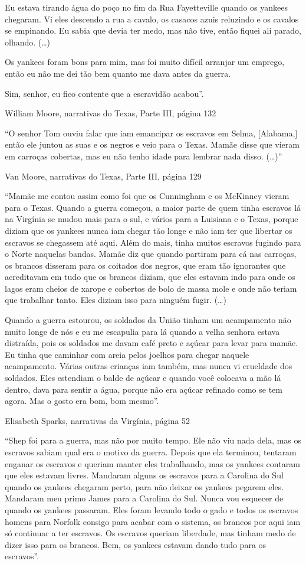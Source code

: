 Eu estava tirando água do poço no fim da Rua Fayetteville quando os
yankees chegaram. Vi eles descendo a rua a cavalo, os casacos azuis
reluzindo e os cavalos se empinando. Eu sabia que devia ter medo, mas
não tive, então fiquei ali parado, olhando. (\ldots{})

Os yankees foram bons para mim, mas foi muito difícil arranjar um
emprego, então eu não me dei tão bem quanto me dava antes da guerra.

Sim, senhor, eu fico contente que a escravidão acabou''.

William Moore, narrativas do Texas, Parte III, página 132

``O senhor Tom ouviu falar que iam emancipar os escravos em Selma,
{[}Alabama,{]} então ele juntou as suas e os negros e veio para o Texas.
Mamãe disse que vieram em carroças cobertas, mas eu não tenho idade para
lembrar nada disso. (\ldots{})''

Van Moore, narrativas do Texas, Parte III, página 129

``Mamãe me contou assim como foi que os Cunningham e os McKinney vieram
para o Texas. Quando a guerra começou, a maior parte de quem tinha
escravos lá na Virgínia se mudou mais para o sul, e vários para a
Luisiana e o Texas, porque diziam que os yankees nunca iam chegar tão
longe e não iam ter que libertar os escravos se chegassem até aqui. Além
do mais, tinha muitos escravos fugindo para o Norte naquelas bandas.
Mamãe diz que quando partiram para cá nas carroças, os brancos disseram
para os coitados dos negros, que eram tão ignorantes que acreditavam em
tudo que os brancos diziam, que eles estavam indo para onde os lagos
eram cheios de xarope e cobertos de bolo de massa mole e onde não teriam
que trabalhar tanto. Eles diziam isso para ninguém fugir. (\ldots{})

Quando a guerra estourou, os soldados da União tinham um acampamento não
muito longe de nós e eu me escapulia para lá quando a velha senhora
estava distraída, pois os soldados me davam café preto e açúcar para
levar para mamãe. Eu tinha que caminhar com areia pelos joelhos para
chegar naquele acampamento. Várias outras crianças iam também, mas nunca
vi crueldade dos soldados. Eles estendiam o balde de açúcar e quando
você colocava a mão lá dentro, dava para sentir a água, porque não era
açúcar refinado como se tem agora. Mas o gosto era bom, bom mesmo''.

Elisabeth Sparks, narrativas da Virgínia, página 52

``Shep foi para a guerra, mas não por muito tempo. Ele não viu nada
dela, mas os escravos sabiam qual era o motivo da guerra. Depois que ela
terminou, tentaram enganar os escravos e queriam manter eles
trabalhando, mas os yankees contaram que eles estavam livres. Mandaram
alguns os escravos para a Carolina do Sul quando os yankees chegaram
perto, para não deixar os yankees pegarem eles. Mandaram meu primo James
para a Carolina do Sul. Nunca vou esquecer de quando os yankees
passaram. Eles foram levando todo o gado e todos os escravos homens para
Norfolk consigo para acabar com o sistema, os brancos por aqui iam só
continuar a ter escravos. Os escravos queriam liberdade, mas tinham medo
de dizer isso para os brancos. Bem, os yankees estavam dando tudo para
os escravos''.

